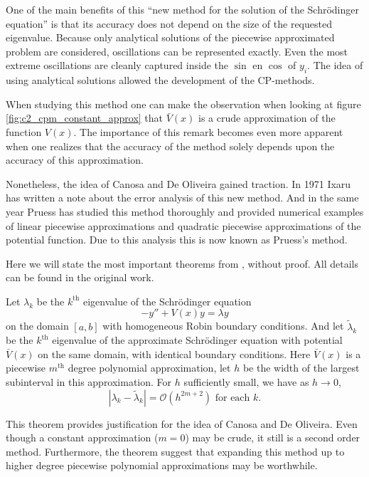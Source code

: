 One of the main benefits of this ``new method for the solution of the Schrödinger equation'' \cite{canosa_new_1970} is that its accuracy does not depend on the size of the requested eigenvalue. Because only analytical solutions of the piecewise approximated problem are considered, oscillations can be represented exactly. Even the most extreme oscillations are cleanly captured inside the $\sin$ en $\cos$ of $y_i$. The idea of using analytical solutions allowed the development of the CP-methods.

When studying this method one can make the observation when looking at figure \ref{fig:c2_cpm_constant_approx} that $\bar{V}(x)$ is a crude approximation of the function $V(x)$. The importance of this remark becomes even more apparent when one realizes that the accuracy of the method solely depends upon the accuracy of this approximation.

Nonetheless, the idea of Canosa and De Oliveira gained traction. In 1971 Ixaru \cite{ixaru_error_1972} has written a note about the error analysis of this new method. And in the same year Pruess \cite{pruess_estimating_1973} has studied this method thoroughly and provided numerical examples of linear piecewise approximations and quadratic piecewise approximations of the potential function. Due to this analysis this is now known as Pruess's method.

Here we will state the most important theorems from \cite{pruess_estimating_1973}, without proof. All details can be found in the original work.

\begin{theorem}[Pruess 1973]\label{the:c2_pruess_1973_1}
    Let $\lambda_k$ be the $k^\text{th}$ eigenvalue of the Schrödinger equation
    $$
        -y'' + V(x) y = \lambda y
    $$
    on the domain $[a, b]$ with homogeneous Robin boundary conditions. And let $\tilde{\lambda}_k$ be the $k^\text{th}$ eigenvalue of the approximate Schrödinger equation with potential $\bar{V}(x)$ on the same domain, with identical boundary conditions. Here $\bar{V}(x)$ is a piecewise $m^\text{th}$ degree polynomial approximation, let $h$ be the width of the largest subinterval in this approximation. For $h$ sufficiently small, we have as $h \to 0$,
    $$
        |\lambda_k - \tilde{\lambda}_k| = \mathcal{O}(h^{2m + 2}) \text{ for each $k$.}
    $$
\end{theorem}

This theorem provides justification for the idea of Canosa and De Oliveira. Even though a constant approximation ($m = 0$) may be crude, it still is a second order method. Furthermore, the theorem suggest that expanding this method up to higher degree piecewise polynomial approximations may be worthwhile.

